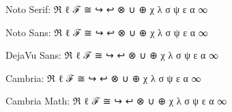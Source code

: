 \documentclass{article}
\begin{document}
\notoserif Noto Serif: ℜ ℓ ℱ ≅ ↪ ↩ ⊗ ∪ ⊕ χ λ σ ψ ε α ∞

\notosans Noto Sans: ℜ ℓ ℱ ≅ ↪ ↩ ⊗ ∪ ⊕ χ λ σ ψ ε α ∞

\dejavusans DejaVu Sans: ℜ ℓ ℱ ≅ ↪ ↩ ⊗ ∪ ⊕ χ λ σ ψ ε α ∞

\cambriatext Cambria: ℜ ℓ ℱ ≅ ↪ ↩ ⊗ ∪ ⊕ χ λ σ ψ ε α ∞

\cambriamath Cambria Math: ℜ ℓ ℱ ≅ ↪ ↩ ⊗ ∪ ⊕ χ λ σ ψ ε α ∞
\end{document}
